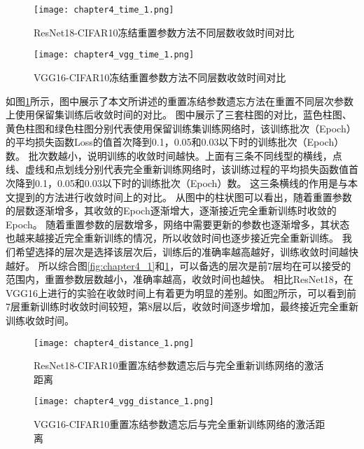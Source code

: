 \begin{figure}
    \centering
    \texttt{[image: chapter4\_time\_1.png]}
    \caption{ResNet18-CIFAR10冻结重置参数方法不同层数收敛时间对比}
    \label{fig:chapter4_time_1}
\end{figure}

\begin{figure}
    \centering
    \texttt{[image: chapter4\_vgg\_time\_1.png]}
    \caption{VGG16-CIFAR10冻结重置参数方法不同层数收敛时间对比}
    \label{fig:chapter4_vgg_time_1}
\end{figure}

如图\ref{fig:chapter4_time_1}所示，图中展示了本文所讲述的重置冻结参数遗忘方法在重置不同层次参数上使用保留集训练后收敛时间的对比。
图中展示了三套柱图的对比，蓝色柱图、黄色柱图和绿色柱图分别代表使用保留训练集训练网络时，该训练批次（Epoch）的平均损失函数Loss的值首次降到0.1，0.05和0.03以下时的训练批次（Epoch）数。
批次数越小，说明训练的收敛时间越快。上面有三条不同线型的横线，点线、虚线和点划线分别代表完全重新训练网络时，该训练过程的平均损失函数值首次降到0.1，0.05和0.03以下时的训练批次（Epoch）数。
这三条横线的作用是与本文提到的方法进行收敛时间上的对比。
从图中的柱状图可以看出，随着重置参数的层数逐渐增多，其收敛的Epoch逐渐增大，逐渐接近完全重新训练时收敛的Epoch。
随着重置参数的层数增多，网络中需要更新的参数也逐渐增多，其状态也越来越接近完全重新训练的情况，所以收敛时间也逐步接近完全重新训练。
我们希望选择的层次是选择该层次后，训练后的准确率越高越好，训练收敛时间越快越好。
所以综合图\ref{fig:chapter4_1}和\ref{fig:chapter4_time_1}，可以备选的层次是前7层均在可以接受的范围内，重置参数层数越小，准确率越高，收敛时间也越快。
相比ResNet18，在VGG16上进行的实验在收敛时间上有着更为明显的差别。如图\ref{fig:chapter4_vgg_time_1}所示，可以看到前7层重新训练时收敛时间较短，第8层以后，收敛时间逐步增加，最终接近完全重新训练收敛时间。
\begin{figure}
    \centering
    \texttt{[image: chapter4\_distance\_1.png]}
    \caption{ResNet18-CIFAR10重置冻结参数遗忘后与完全重新训练网络的激活距离}
    \label{fig:chapter4_distance_1}
\end{figure}

\begin{figure}
    \centering
    \texttt{[image: chapter4\_vgg\_distance\_1.png]}
    \caption{VGG16-CIFAR10重置冻结参数遗忘后与完全重新训练网络的激活距离}
    \label{fig:chapter4_vgg_distance_1}
\end{figure}

